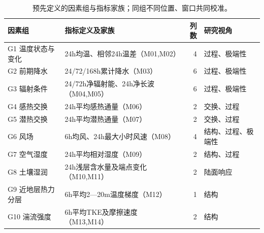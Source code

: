 \begin{table}[H]\centering\small
\caption{预先定义的因素组与指标家族；同组不同位置、窗口共同校准。}
\label{tab:q1:candidates}
\begin{tabularx}{\linewidth}{lXrl}\toprule 因素组 & 指标定义及家族 & 列数 & 研究视角\\\midrule
G1 温度状态与变化 & 24h均温、相邻24h温差（M01,M02） & 4 & 过程、极端性 \\
G2 前期降水 & 24/72/168h累计降水（M03） & 6 & 过程、极端性 \\
G3 辐射条件 & 24/72h净辐射能、24h净长波（M04,M05） & 6 & 过程、极端性 \\
G4 感热交换 & 24h平均感热通量（M06） & 2 & 交换、过程 \\
G5 潜热交换 & 24h平均潜热通量（M07） & 2 & 交换、过程 \\
G6 风场 & 6h均风、24h最大小时风速（M08） & 4 & 结构、过程、极端性 \\
G7 空气湿度 & 24h平均相对湿度（M09） & 2 & 结构、过程 \\
G8 土壤湿润 & 24h浅层含水量及端点变化（M10,M11） & 2 & 陆面响应 \\
G9 近地层热力分层 & 6h平均2—20m温度梯度（M12） & 1 & 结构 \\
G10 湍流强度 & 6h平均TKE及摩擦速度（M13,M14） & 2 & 结构 \\
\bottomrule\end{tabularx}\end{table}
